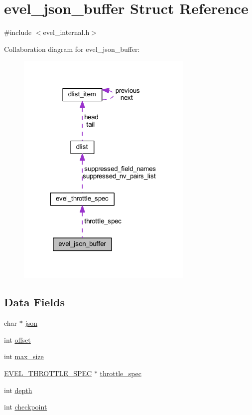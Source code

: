 \hypertarget{structevel__json__buffer}{}\section{evel\+\_\+json\+\_\+buffer Struct Reference}
\label{structevel__json__buffer}


{\ttfamily \#include $<$evel\+\_\+internal.\+h$>$}



Collaboration diagram for evel\+\_\+json\+\_\+buffer\+:
\nopagebreak
\begin{figure}[H]
\begin{center}
\leavevmode
\includegraphics[width=240pt]{structevel__json__buffer__coll__graph}
\end{center}
\end{figure}
\subsection*{Data Fields}
\begin{DoxyCompactItemize}
\item 
char $\ast$ \hyperlink{structevel__json__buffer_a04cb4f4f3ea9f7bf73a08c128c4608b1}{json}
\item 
int \hyperlink{structevel__json__buffer_a30a33971848b5da3466e58f3a15a5d23}{offset}
\item 
int \hyperlink{structevel__json__buffer_ad13f44105bee4bbf2a3c46d92f777ac8}{max\+\_\+size}
\item 
\hyperlink{evel__internal_8h_a50932473d7d2e8f802d39b4f73e5b64f}{E\+V\+E\+L\+\_\+\+T\+H\+R\+O\+T\+T\+L\+E\+\_\+\+S\+P\+EC} $\ast$ \hyperlink{structevel__json__buffer_a5e95f365ab2e96efafa55584491267f3}{throttle\+\_\+spec}
\item 
int \hyperlink{structevel__json__buffer_a0710f8e8c62797e2151a68e3543ac81e}{depth}
\item 
int \hyperlink{structevel__json__buffer_ac1e8cd1cc09c857b6a69e07a5dade344}{checkpoint}
\end{DoxyCompactItemize}



